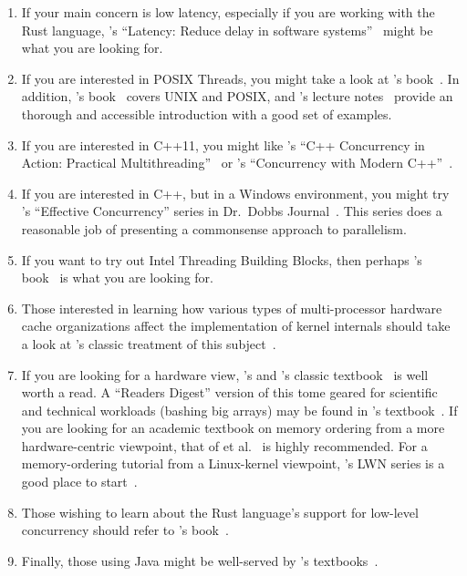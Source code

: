 \begin{enumerate}
\item	If your main concern is low latency, especially if you are
	working with the Rust language, 's
	``Latency:
	Reduce delay in software
	systems''~\cite{PekkaEnberg2026Latency}
	might be what you are looking for.
\item	If you are interested in POSIX Threads, you might take
	a look at 's book~\cite{Butenhof1997pthreads}.
	In addition,
	's book~\cite{WRichardStevens1992,WRichardStevens2013}
	covers UNIX and POSIX, and 's lecture
	notes~\cite{StewartWeiss2013UNIX} provide an
	thorough and accessible introduction with a good set of
	examples.
\item	If you are interested in C++11, you might like
	's ``C++ Concurrency in Action:
	Practical Multithreading''~\cite{AnthonyWilliams2012,AnthonyWilliams2019}
	or 's ``Concurrency with Modern
	C++''~\cite{RainerGrimm2017C++Concurrency}.
\item	If you are interested in C++, but in a Windows environment,
	you might try 's ``Effective Concurrency''
	series in
	Dr.~Dobbs Journal~\cite{HerbSutter2008EffectiveConcurrency}.
	This series does a reasonable job of presenting a
	commonsense approach to parallelism.
\item	If you want to try out Intel Threading Building Blocks,
	then perhaps 's book~\cite{Reinders2007Textbook}
	is what you are looking for.
\item	Those interested in learning how various types of multi-processor
	hardware
	cache organizations affect the implementation of kernel
	internals should take a look at 's classic
	treatment of this subject~\cite{Schimmel:1994:USM:175689}.
\item	If you are looking for a hardware view, 's and
	's classic
	textbook~\cite{Hennessy2026} is well worth a read.
	A ``Readers Digest'' version of this tome geared for scientific
	and technical workloads (bashing big arrays) may be found in
	's
	textbook~\cite{AndrewChien2022ComputerArchitectureScientists}.
	If you are looking for an academic textbook on memory ordering from
	a more hardware-centric viewpoint,
	that of  et al.~\cite{DanielJSorin2011MemModel,%
	VijayNagarajan2020MemModel}
	is highly recommended.
	For a memory-ordering tutorial from a Linux-kernel viewpoint,
	's LWN series is a good place to
	start~\cite{PaoloBonzini2021lockless1,PaoloBonzini2021lockless2,PaoloBonzini2021lockless3,PaoloBonzini2021lockless4,PaoloBonzini2021lockless5,PaoloBonzini2021lockless6}.
\item	Those wishing to learn about the Rust language's
	support for low-level concurrency should refer to 's
	book~\cite{MaraBos2023RustAtomicsAndLocks}.
\item	Finally, those using Java might be well-served by 's
	textbooks~\cite{DougLea1997Textbook,Goetz2007Textbook}.
\end{enumerate}

